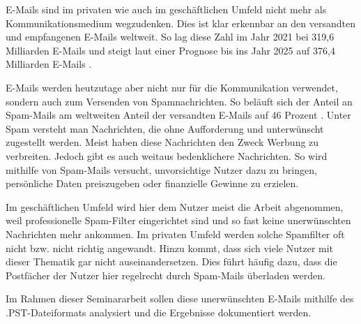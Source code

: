 E-Mails sind im privaten wie auch im geschäftlichen Umfeld nicht mehr als Kommunikationsmedium wegzudenken. Dies ist klar erkennbar an den versandten und empfangenen E-Mails weltweit. So lag diese Zahl im Jahr 2021 bei 319,6 Milliarden E-Mails und steigt laut einer Prognose bis ins Jahr 2025 auf 376,4 Milliarden E-Mails \cite{Statista.26.06.2022}. 

E-Mails werden heutzutage aber nicht nur für die Kommunikation verwendet, sondern auch zum Versenden von Spamnachrichten. So beläuft sich der Anteil an Spam-Mails am weltweiten Anteil der versandten E-Mails auf 46 Prozent \cite{ASITZentrumfursichereInformationstechnologieAustria.26.06.2022}. Unter Spam versteht man Nachrichten, die ohne Aufforderung und unterwünscht zugestellt werden. Meist haben diese Nachrichten den Zweck Werbung zu verbreiten. Jedoch gibt es auch weitaus bedenklichere Nachrichten. So wird mithilfe von Spam-Mails versucht, unvorsichtige Nutzer dazu zu bringen, persönliche Daten preiszugeben oder finanzielle Gewinne zu erzielen. 

Im geschäftlichen Umfeld wird hier dem Nutzer meist die Arbeit abgenommen, weil professionelle Spam-Filter eingerichtet sind und so fast keine unerwünschten Nachrichten mehr ankommen. Im privaten Umfeld werden solche Spamfilter oft nicht bzw. nicht richtig angewandt. Hinzu kommt, dass sich viele Nutzer mit dieser Thematik gar nicht auseinandersetzen. Dies führt häufig dazu, dass die Postfächer der Nutzer hier regelrecht durch Spam-Mails überladen werden. 

Im Rahmen dieser Seminararbeit sollen diese unerwünschten E-Mails mithilfe des .PST-Dateiformats analysiert und die Ergebnisse dokumentiert werden.